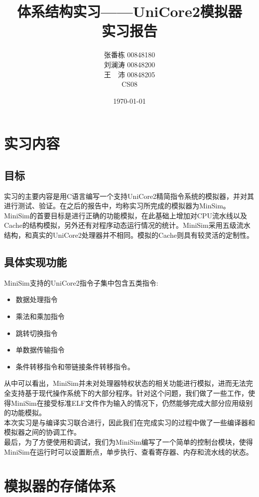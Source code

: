 \documentclass[12pt,a4paper,Flow]{report}
\begin{document}
\title{\textbf{体系结构实习——UniCore2模拟器\\实习报告}}
\author{张番栋 00848180\\刘澜涛 00848200\\王　沛 00848205\\CS08}
\date{\today}
\maketitle
\tableofcontents
\newpage
\chapter{实习内容}
\section{目标}
实习的主要内容是用C语言编写一个支持UniCore2精简指令系统的模拟器，并对其进行测试、验证。在之后的报告中，均称实习所完成的模拟器为MinSim。MiniSim的首要目标是进行正确的功能模拟，在此基础上增加对CPU流水线以及Cache的结构模拟，另外还有对程序动态运行情况的统计。MiniSim采用五级流水结构，和真实的UniCore2处理器并不相同。模拟的Cache则具有较灵活的定制性。\\
\section{具体实现功能}
\indent MiniSim支持的UniCore2指令子集中包含五类指令:
\begin{itemize}
\item 数据处理指令
\item 乘法和乘加指令
\item 跳转切换指令
\item 单数据传输指令
\item 条件转移指令和带链接条件转移指令。
\end{itemize}
\indent 从中可以看出，MiniSim并未对处理器特权状态的相关功能进行模拟，进而无法完全支持基于现代操作系统下的大部分程序。针对这个问题，我们做了一些工作，使得MiniSim在接受标准ELF文件作为输入的情况下，仍然能够完成大部分应用级别的功能模拟。\\
\indent 本次实习是与编译实习联合进行，因此我们在完成实习的过程中做了一些编译器和模拟器之间的协调工作。\\
\indent 最后，为了方便使用和调试，我们为MiniSim编写了一个简单的控制台模块，使得MiniSim在运行时可以设置断点，单步执行、查看寄存器、内存和流水线的状态。
\chapter{模拟器的存储体系}
\end{document}
